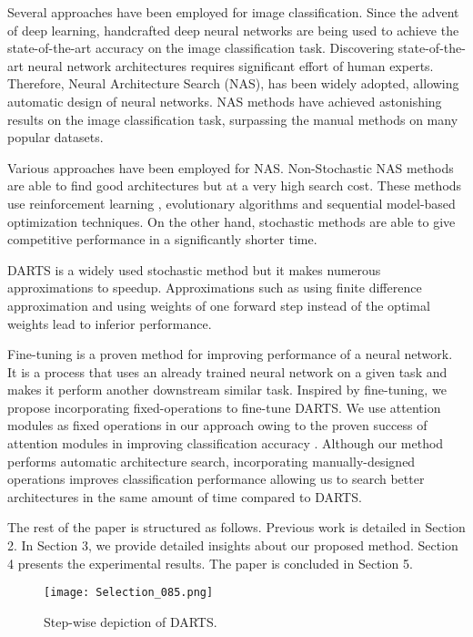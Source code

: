 \documentclass[10pt,a4paper,conference]{IEEEtran}
\begin{document}
Several approaches have been employed for image classification. Since the advent of deep learning, handcrafted deep neural networks are being used to achieve the state-of-the-art accuracy on the image classification task. Discovering state-of-the-art neural network architectures requires significant effort of human experts. Therefore, Neural Architecture Search (NAS), has been widely adopted, allowing automatic design of neural networks. NAS methods have achieved astonishing results on the image classification task, surpassing the manual methods on many popular datasets.

Various approaches have been employed for NAS. Non-Stochastic NAS methods are able to find good architectures but at a very high search cost. These methods use reinforcement learning \cite{zoph2018learning:1}, evolutionary algorithms \cite{RealAggarwalHuangLe2018:5} and sequential model-based optimization \cite{Liu_2018:4} techniques. On the other hand, stochastic methods are able to give competitive performance in a significantly shorter time.

DARTS \cite{liu2018darts:6} is a widely used stochastic method but it makes numerous approximations to speedup. Approximations such as using finite difference approximation and using weights of one forward step instead of the optimal weights lead to inferior performance.

Fine-tuning  is  a proven method  for  improving  performance of a neural network.
It is a process that uses an already trained neural network on a given task and makes it perform another downstream similar task. Inspired by fine-tuning, we propose incorporating fixed-operations to fine-tune DARTS. We use attention modules as fixed operations in our approach owing to the proven success of attention modules in improving classification accuracy \cite{hu2018squeeze:20}. Although our method performs automatic architecture search, incorporating manually-designed operations improves classification performance allowing us to search better architectures in the same amount of time compared to DARTS. 

The rest of the paper is structured as follows. Previous
work is detailed in Section 2. In Section 3, we provide detailed insights about our proposed method. Section 4 presents the experimental
results. The paper is concluded in Section 5.
\begin{figure*}
\texttt{[image: Selection\_085.png]}
\caption{Step-wise depiction of DARTS.}
\label{fig:13}
\end{figure*}
\end{document}
